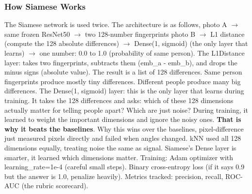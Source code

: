 \documentclass[conference]{IEEEtran}
\begin{document}
\subsubsection{How Siamese Works}
The Siamese network is used twice.
The architecture is as follows,
photo A $\rightarrow$ same frozen ResNet50 $\rightarrow$ two 128-number fingerprints
photo B $\rightarrow$ L1 distance (compute the 128 absolute differences) $\rightarrow$ Dense(1, sigmoid) (the only layer that learns) $\rightarrow$ one number: 0.0 to 1.0 (probability of same person).
The L1Distance layer: takes two fingerprints, subtracts them (emb\_a - emb\_b), and drops the minus signs (absolute value). The result is a list of 128 differences. Same person fingerprints produce mostly tiny differences. Different people produce many big differences.
The Dense(1, sigmoid) layer: this is the only layer that learns during training. It takes the 128 differences and asks: which of these 128 dimensions actually matter for telling people apart? Which are just noise? During training, it learned to weight the important dimensions and ignore the noisy ones. \textbf{That is why it beats the baselines}.
Why this wins over the baselines, pixel-difference just measured pixels directly and failed when angles changed. kNN used all 128 dimensions equally, treating noise the same as signal. Siamese's Dense layer is smarter, it learned which dimensions matter.
Training: Adam optimizer with learning\_rate=1e-4 (careful small steps). Binary cross-entropy loss (if it says 0.9 but the answer is 1.0, penalize heavily). Metrics tracked: precision, recall, ROC-AUC (the rubric scorecard).
\end{document}
